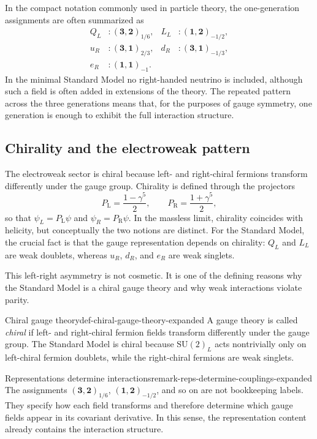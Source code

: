 \documentclass[11pt,a4paper]{article}
\newcommand{\gfive}{\gamma^5}
\newcommand{\PL}{P_{\mathrm{L}}}
\newcommand{\PR}{P_{\mathrm{R}}}
\newcommand{\SUw}{\mathrm{SU}(2)_L}
\begin{document}
In the compact notation commonly used in particle theory, the one-generation assignments are often summarized as
\[
\begin{aligned}
Q_L & : (\mathbf{3},\mathbf{2})_{1/6},
&
L_L & : (\mathbf{1},\mathbf{2})_{-1/2},
\\[0.2em]u_R & : (\mathbf{3},\mathbf{1})_{2/3},
&d_R & : (\mathbf{3},\mathbf{1})_{-1/3},
\\[0.2em]e_R & : (\mathbf{1},\mathbf{1})_{-1}.
\end{aligned}
\]
In the minimal Standard Model no right-handed neutrino is included, although such a field is often added in extensions of the theory. The repeated pattern across the three generations means that, for the purposes of gauge symmetry, one generation is enough to exhibit the full interaction structure.



\subsection{Chirality and the electroweak pattern}

The electroweak sector is chiral because left- and right-chiral fermions transform differently under the gauge group. Chirality is defined through the projectors
\[
\PL=\frac{1-\gfive}{2},
\qquad
\PR=\frac{1+\gfive}{2},
\]
so that \(\psi_L=\PL\psi\) and \(\psi_R=\PR\psi\). In the massless limit, chirality coincides with helicity, but conceptually the two notions are distinct. For the Standard Model, the crucial fact is that the gauge representation depends on chirality: \(Q_L\) and \(L_L\) are weak doublets, whereas \(u_R\), \(d_R\), and \(e_R\) are weak singlets.

This left-right asymmetry is not cosmetic. It is one of the defining reasons why the Standard Model is a chiral gauge theory and why weak interactions violate parity.

\begin{definition}{Chiral gauge theory}{def-chiral-gauge-theory-expanded}
A gauge theory is called \emph{chiral} if left- and right-chiral fermion fields transform differently under the gauge group. The Standard Model is chiral because \(\SUw\) acts nontrivially only on left-chiral fermion doublets, while the right-chiral fermions are weak singlets.
\end{definition}

\begin{remarkbox}{Representations determine interactions}{remark-reps-determine-couplings-expanded}
The assignments \((\mathbf{3},\mathbf{2})_{1/6}\), \((\mathbf{1},\mathbf{2})_{-1/2}\), and so on are not bookkeeping labels. They specify how each field transforms and therefore determine which gauge fields appear in its covariant derivative. In this sense, the representation content already contains the interaction structure.
\end{remarkbox}
\end{document}
